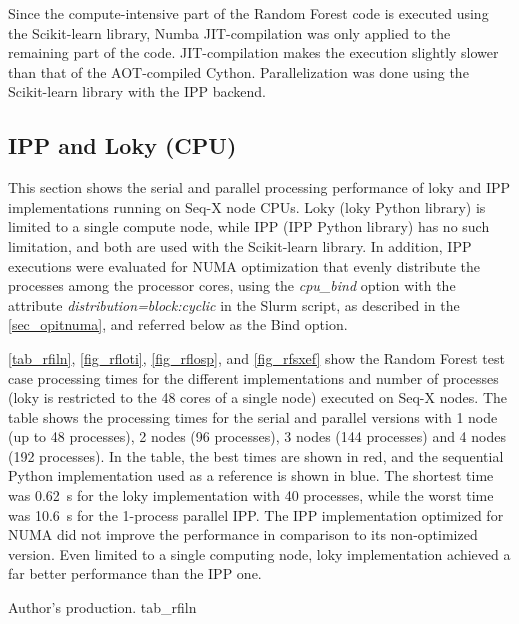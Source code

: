 Since the compute-intensive part of the Random Forest code is executed using the Scikit-learn library, Numba JIT-compilation was only applied to the remaining part of the code. JIT-compilation makes the execution slightly slower than that of the AOT-compiled Cython. Parallelization was done using the Scikit-learn library with the IPP backend.

%
%
% 
\subsection{IPP and Loky (CPU)}
\label{sec_ipploky}

This section shows the serial and parallel processing performance of loky and IPP implementations running on Seq-X node CPUs. Loky (loky Python library) is limited to a single compute node, while IPP (IPP Python library) has no such limitation, and both are used with the Scikit-learn library. In addition, IPP executions were evaluated for NUMA optimization that evenly distribute the processes among the processor cores, using the \textit {cpu\_bind} option with the attribute \textit {distribution=block:cyclic} in the Slurm script, as described in the \autoref {sec_opitnuma}, and referred below as the Bind option. 

\autoref {tab_rfiln}, \autoref {fig_rfloti}, \autoref {fig_rflosp}, and \autoref {fig_rfsxef} show the Random Forest test case processing times for the different implementations and number of processes (loky is restricted to the 48 cores of a single node) executed on Seq-X nodes. The table shows the processing times for the serial and parallel versions with 1 node (up to 48 processes), 2 nodes (96 processes), 3 nodes (144 processes) and 4 nodes (192 processes). In the table, the best times are shown in red, and the sequential Python implementation used as a reference is shown in blue. The shortest time was 0.62~s for the loky implementation with 40 processes, while the worst time was 10.6~s for the 1-process parallel IPP. The IPP implementation optimized for NUMA did not improve the performance in comparison to its non-optimized version. Even limited to a single computing node, loky implementation achieved a far better performance than the IPP one.

     {Author's production.} {tab_rfiln}

